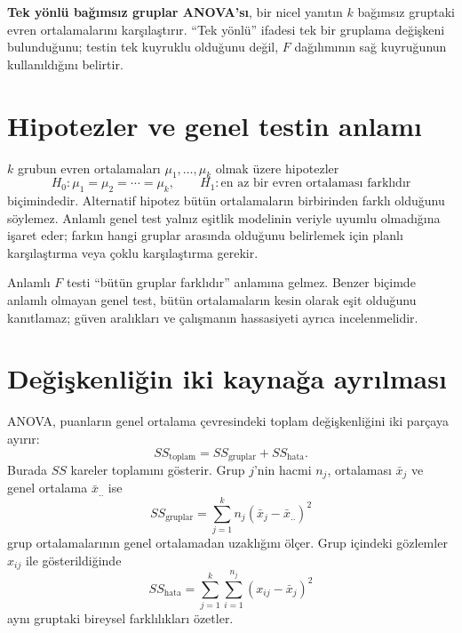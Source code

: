 \begin{definitionbox}
\textbf{Tek yönlü bağımsız gruplar ANOVA'sı}, bir nicel yanıtın $k$ bağımsız
gruptaki evren ortalamalarını karşılaştırır. ``Tek yönlü'' ifadesi tek bir
gruplama değişkeni bulunduğunu; testin tek kuyruklu olduğunu değil, $F$
dağılımının sağ kuyruğunun kullanıldığını belirtir.
\end{definitionbox}

\section{Hipotezler ve genel testin anlamı}
\label{sec:anova-hypotheses}

$k$ grubun evren ortalamaları $\mu_1,\ldots,\mu_k$ olmak üzere hipotezler
\[
H_0:\mu_1=\mu_2=\cdots=\mu_k,
\qquad
H_1:\text{en az bir evren ortalaması farklıdır}
\]
biçimindedir. Alternatif hipotez bütün ortalamaların birbirinden farklı
olduğunu söylemez. Anlamlı genel test yalnız eşitlik modelinin veriyle uyumlu
olmadığına işaret eder; farkın hangi gruplar arasında olduğunu belirlemek için
planlı karşılaştırma veya çoklu karşılaştırma gerekir.

\begin{mistakebox}
Anlamlı $F$ testi ``bütün gruplar farklıdır'' anlamına gelmez. Benzer biçimde
anlamlı olmayan genel test, bütün ortalamaların kesin olarak eşit olduğunu
kanıtlamaz; güven aralıkları ve çalışmanın hassasiyeti ayrıca incelenmelidir.
\end{mistakebox}

\section{Değişkenliğin iki kaynağa ayrılması}
\label{sec:anova-decomposition}

ANOVA, puanların genel ortalama çevresindeki toplam değişkenliğini iki parçaya
ayırır:
\[
SS_{\text{toplam}}=SS_{\text{gruplar}}+SS_{\text{hata}}.
\]
Burada $SS$ kareler toplamını gösterir. Grup $j$'nin hacmi $n_j$, ortalaması
$\bar x_j$ ve genel ortalama $\bar x_{..}$ ise
\[
SS_{\text{gruplar}}
=\sum_{j=1}^{k}n_j(\bar x_j-\bar x_{..})^2
\]
grup ortalamalarının genel ortalamadan uzaklığını ölçer. Grup içindeki
gözlemler $x_{ij}$ ile gösterildiğinde
\[
SS_{\text{hata}}
=\sum_{j=1}^{k}\sum_{i=1}^{n_j}(x_{ij}-\bar x_j)^2
\]
aynı gruptaki bireysel farklılıkları özetler.

